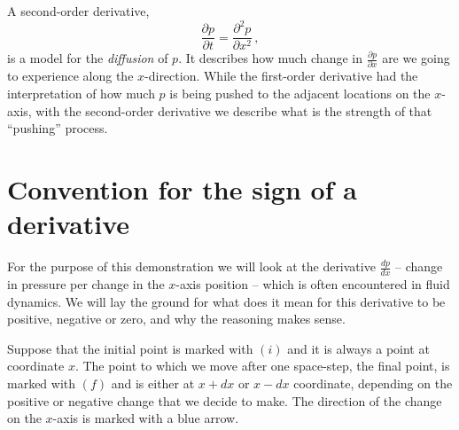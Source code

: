 A second-order derivative,
\begin{equation*}\label{eq:change-partial-2nd}
\frac{\partial p}{\partial t} = \frac{\partial^2 p}{\partial x^2} \, ,
\end{equation*}
is a model for the \textit{diffusion} of $p$. It describes how much change in $\frac{\partial p}{\partial x}$ are we going to experience along the $x$-direction. While the first-order derivative had the interpretation of how much $p$ is being pushed to the adjacent locations on the $x$-axis, with the second-order derivative we describe what is the strength of that ``pushing'' process.






\section{Convention for the sign of a derivative}

For the purpose of this demonstration we will look at the derivative $\frac{dp}{dx}$ -- change in pressure per change in the $x$-axis position -- which is often encountered in fluid dynamics. We will lay the ground for what does it mean for this derivative to be positive, negative or zero, and why the reasoning makes sense.

Suppose that the initial point is marked with \textcolor{myblue}{$(i)$} and it is always a point at coordinate $x$. The point to which we move after one space-step, the final point, is marked with \textcolor{myblue}{$(f)$} and is either at $x+dx$ or $x - dx$ coordinate, depending on the positive or negative change that we decide to make. The direction of the change on the $x$-axis is marked with a blue arrow.

